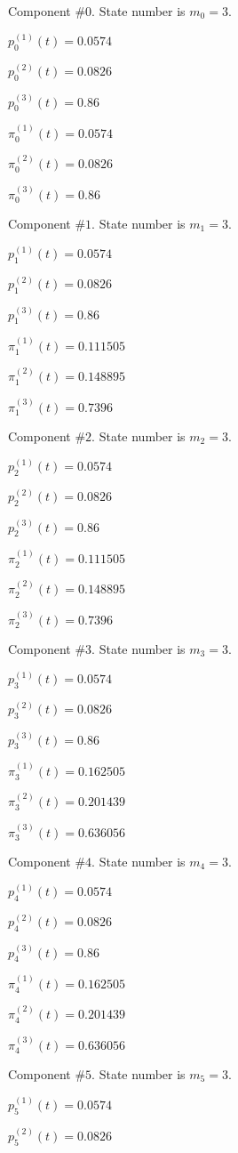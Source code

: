 

 Component #$0$. State number is $m_0=3$.

 $p^{(1)}_0(t)=0.0574$

 $p^{(2)}_0(t)=0.0826$

 $p^{(3)}_0(t)=0.86$

 $\pi^{(1)}_0(t)=0.0574$

 $\pi^{(2)}_0(t)=0.0826$

 $\pi^{(3)}_0(t)=0.86$

 Component #$1$. State number is $m_1=3$.

 $p^{(1)}_1(t)=0.0574$

 $p^{(2)}_1(t)=0.0826$

 $p^{(3)}_1(t)=0.86$

 $\pi^{(1)}_1(t)=0.111505$

 $\pi^{(2)}_1(t)=0.148895$

 $\pi^{(3)}_1(t)=0.7396$

 Component #$2$. State number is $m_2=3$.

 $p^{(1)}_2(t)=0.0574$

 $p^{(2)}_2(t)=0.0826$

 $p^{(3)}_2(t)=0.86$

 $\pi^{(1)}_2(t)=0.111505$

 $\pi^{(2)}_2(t)=0.148895$

 $\pi^{(3)}_2(t)=0.7396$

 Component #$3$. State number is $m_3=3$.

 $p^{(1)}_3(t)=0.0574$

 $p^{(2)}_3(t)=0.0826$

 $p^{(3)}_3(t)=0.86$

 $\pi^{(1)}_3(t)=0.162505$

 $\pi^{(2)}_3(t)=0.201439$

 $\pi^{(3)}_3(t)=0.636056$

 Component #$4$. State number is $m_4=3$.

 $p^{(1)}_4(t)=0.0574$

 $p^{(2)}_4(t)=0.0826$

 $p^{(3)}_4(t)=0.86$

 $\pi^{(1)}_4(t)=0.162505$

 $\pi^{(2)}_4(t)=0.201439$

 $\pi^{(3)}_4(t)=0.636056$

 Component #$5$. State number is $m_5=3$.

 $p^{(1)}_5(t)=0.0574$

 $p^{(2)}_5(t)=0.0826$

